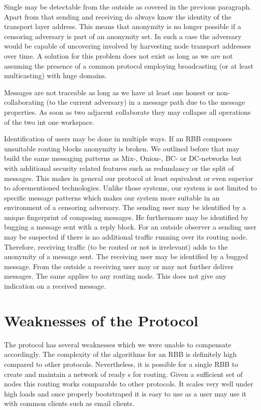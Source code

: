 Single \VortexMessages{} may be detectable from the outside as covered in the previous paragraph. Apart from that sending and receiving \VortexNodes{} do always know the identity of the transport layer address. This means that anonymity is no longer possible if a censoring adversary is part of an anonymity set. In such a case the adversary would be capable of uncovering involved \VortexNodes{} by harvesting node transport addresses over time. A solution for this problem does not exist as long as we are not assuming the presence of a common protocol employing broadcasting (or at least multicasting) with huge domains.

Messages are not traceable as long as we have at least one honest or  non-collaborating (to the current adversary) \VortexNode{} in a message path due to the message properties. As soon as two adjacent \VortexNodes collaborate they may collapse all operations of the two int one workspace.

Identification of \MessageVortex{} users may be done in multiple ways. If an RBB composes unsuitable routing blocks anonymity is broken. We outlined before that \MessageVortex{} may build the same messaging patterns as Mix-, Onion-, BC- or DC-networks but with additional security related features such as redundancy or the split of messages. This makes in general our protocol at least equivalent or even superior to aforementioned technologies. Unlike those systems, our system is not limited to specific message patterns which makes our system more suitable in an environment of a censoring adversary. The sending user may be identified by a unique fingerprint of composing messages. He furthermore may be identified by bugging a message sent with a reply block. For an outside observer a sending user may be suspected if there is no additional traffic running over its routing node. Therefore, receiving traffic (to be routed or not is irrelevant) adds to the anonymity of a message sent. The receiving user may be identified by a bugged message. From the outside a receiving user may or may not further deliver messages. The same applies to any routing node. This does not give any indication on a received message.

\chapter{Weaknesses of the Protocol}
The protocol has several weaknesses which we were unable to compensate accordingly. The complexity of the algorithms for an RBB is definitely high compared to other protocols. Nevertheless, it is possible for a single RBB to create and maintain a network of ready s for routing. Given a sufficient set of nodes this routing works comparable to other protocols. It scales very well under high loads and once properly bootstraped it is easy to use as  a user may use it with common clients such as email clients.

